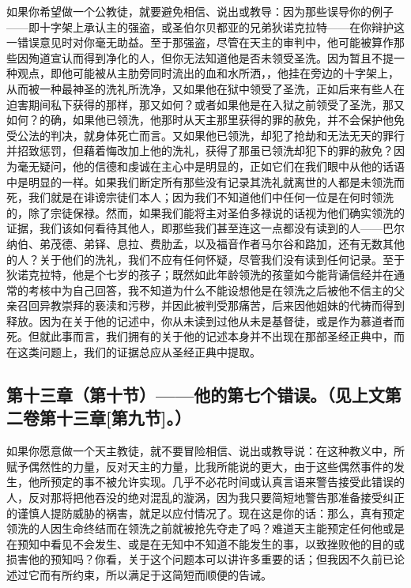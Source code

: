 如果你希望做一个公教徒，就要避免相信、说出或教导：因为那些误导你的例子——即十字架上承认主的强盗，或圣伯尔贝都亚的兄弟狄诺克拉特——在你辩护这一错误意见时对你毫无助益。至于那强盗，尽管在天主的审判中，他可能被算作那些因殉道宣认而得到净化的人，但你无法知道他是否未领受圣洗。因为暂且不提一种观点，即他可能被从主肋旁同时流出的血和水所洒，，他挂在旁边的十字架上，从而被一种最神圣的洗礼所洗净，又如果他在狱中领受了圣洗，正如后来有些人在迫害期间私下获得的那样，那又如何？或者如果他是在入狱之前领受了圣洗，那又如何？的确，如果他已领洗，他那时从天主那里获得的罪的赦免，并不会保护他免受公法的判决，就身体死亡而言。又如果他已领洗，却犯了抢劫和无法无天的罪行并招致惩罚，但藉着悔改加上他的洗礼，获得了那虽已领洗却犯下的罪的赦免？因为毫无疑问，他的信德和虔诚在主心中是明显的，正如它们在我们眼中从他的话语中是明显的一样。如果我们断定所有那些没有记录其洗礼就离世的人都是未领洗而死，我们就是在诽谤宗徒们本人；因为我们不知道他们中任何一位是在何时领洗的，除了宗徒保禄。然而，如果我们能将主对圣伯多禄说的话视为他们确实领洗的证据，我们该如何看待其他人，即那些我们甚至连这一点都没有读到的人——巴尔纳伯、弟茂德、弟铎、息拉、费肋孟，以及福音作者马尔谷和路加，还有无数其他的人？关于他们的洗礼，我们不应有任何怀疑，尽管我们没有读到任何记录。至于狄诺克拉特，他是个七岁的孩子；既然如此年龄领洗的孩童如今能背诵信经并在通常的考核中为自己回答，我不知道为什么不能设想他是在领洗之后被他不信主的父亲召回异教崇拜的亵渎和污秽，并因此被判受那痛苦，后来因他姐妹的代祷而得到释放。因为在关于他的记述中，你从未读到过他从未是基督徒，或是作为慕道者而死。但就此事而言，我们拥有的关于他的记述本身并不出现在那部圣经正典中，而在这类问题上，我们的证据总应从圣经正典中提取。\par


\subsection{第十三章（第十节）——他的第七个错误。（见上文第二卷第十三章[第九节]。）}

如果你愿意做一个天主教徒，就不要冒险相信、说出或教导说：在这种教义中，所赋予偶然性的力量，反对天主的力量，比我所能说的更大，由于这些偶然事件的发生，他所预定的事不被允许实现。几乎不必花时间或认真言语来警告接受此错误的人，反对那将把他吞没的绝对混乱的漩涡，因为我只要简短地警告那准备接受纠正的谨慎人提防威胁的祸害，就足以应付情况了。现在这是你的话：那么，真有预定领洗的人因生命终结而在领洗之前就被抢先夺走了吗？难道天主能预定任何他或是在预知中看见不会发生、或是在无知中不知道不能发生的事，以致挫败他的目的或损害他的预知吗？你看，关于这个问题本可以讲许多重要的话；但我因不久前已论述过它而有所约束，所以满足于这简短而顺便的告诫。\par

